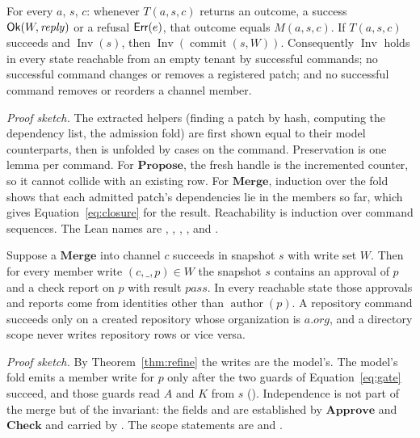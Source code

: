 \begin{claim}\label{thm:refine}
For every $a$, $s$, $c$: whenever $T(a,s,c)$ returns an outcome, a success $\mathsf{Ok}(W,\mathit{reply})$ or a refusal $\mathsf{Err}(e)$, that outcome equals $M(a,s,c)$. If $T(a,s,c)$ succeeds and $\operatorname{Inv}(s)$, then $\operatorname{Inv}(\operatorname{commit}(s,W))$. Consequently $\operatorname{Inv}$ holds in every state reachable from an empty tenant by successful commands; no successful command changes or removes a registered patch; and no successful command removes or reorders a channel member.
\end{claim}
\noindent\emph{Proof sketch.} The extracted helpers (finding a patch by hash, computing the dependency list, the admission fold) are first shown equal to their model counterparts, then  is unfolded by cases on the command. Preservation is one lemma per command. For $\mathbf{Propose}$, the fresh handle is the incremented counter, so it cannot collide with an existing row. For $\mathbf{Merge}$, induction over the fold shows that each admitted patch's dependencies lie in the members so far, which gives Equation~\ref{eq:closure} for the result. Reachability is induction over command sequences. The Lean names are , , , , and .

\begin{claim}\label{thm:gate}
Suppose a $\mathbf{Merge}$ into channel $c$ succeeds in snapshot $s$ with write set $W$. Then for every member write $(c,\_,p)\in W$ the snapshot $s$ contains an approval of $p$ and a check report on $p$ with result $\mathit{pass}$. In every reachable state those approvals and reports come from identities other than $\operatorname{author}(p)$. A repository command succeeds only on a created repository whose organization is $a.\mathit{org}$, and a directory scope never writes repository rows or vice versa.
\end{claim}
\noindent\emph{Proof sketch.} By Theorem~\ref{thm:refine} the writes are the model's. The model's fold emits a member write for $p$ only after the two guards of Equation~\ref{eq:gate} succeed, and those guards read $A$ and $K$ from $s$ (). Independence is not part of the merge but of the invariant: the fields  and  are established by $\mathbf{Approve}$ and $\mathbf{Check}$ and carried by . The scope statements are  and .


